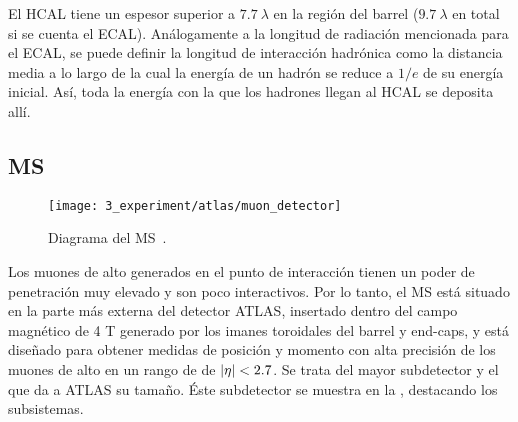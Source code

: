 El \ac{HCAL} tiene un espesor superior a \(7.7~\lambda\) en la región del barrel (\(9.7~\lambda\) en total si se cuenta el \ac{ECAL}). Análogamente a la longitud de radiación mencionada para el \ac{ECAL}, se puede definir la longitud de interacción hadrónica como la distancia media a lo largo de la cual la energía de un hadrón se reduce a \(1/e\) de su energía inicial. Así, toda la energía con la que los hadrones llegan al \ac{HCAL} se deposita allí.





\subsection{\acf{MS}}

\begin{figure}[ht!]
    \centering
    \texttt{[image: 3\_experiment/atlas/muon\_detector]}
    \caption{Diagrama del \acf{MS}~\cite{ATLAS}.}
    \label{fig:atlas:atlas:muon_spectrometer:muon_spectrometer}
\end{figure}

Los muones de alto \pt generados en el punto de interacción tienen un poder de penetración muy elevado y son poco interactivos. Por lo tanto, el \ac{MS} \cite{ATLAS-Muon-TDR} está situado en la parte más externa del detector \ac{ATLAS}, insertado dentro del campo magnético de 4 T generado por los imanes toroidales del barrel y end-caps, y está diseñado para obtener medidas de posición y momento con alta precisión de los muones de alto \pt en un rango de \abseta de \(|\eta|<2.7\). Se trata del mayor subdetector y el que da a \ac{ATLAS} su tamaño. \'Este subdetector se muestra en la \Fig{\ref{fig:atlas:atlas:muon_spectrometer:muon_spectrometer}}, destacando los subsistemas.

